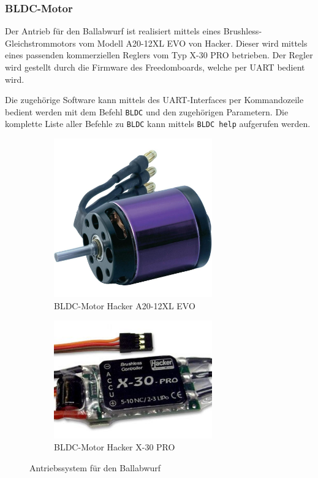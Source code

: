 \subsubsection{BLDC-Motor}
Der Antrieb für den Ballabwurf ist realisiert mittels eines
Brushless-Gleichstrommotors vom Modell A20-12XL EVO von Hacker.
Dieser wird mittels eines passenden kommerziellen Reglers vom
Typ X-30 PRO betrieben. Der Regler wird gestellt durch die Firmware
des Freedomboards, welche per UART bedient wird.

Die zugehörige Software kann mittels des UART-Interfaces per
Kommandozeile bedient werden mit dem Befehl \verb!BLDC! und den
zugehörigen Parametern. Die komplette Liste aller Befehle zu
\verb!BLDC! kann mittels \verb!BLDC help! aufgerufen werden.

\begin{figure}[h!]
	\centering
	\begin{subfigure}[b]{0.45\textwidth}
		\centering
		\includegraphics[width=0.75\textwidth]{../../fig/et/a20_12xl_evo.jpg}
		\caption{BLDC-Motor Hacker A20-12XL EVO}
	\end{subfigure}
	\begin{subfigure}[b]{0.45\textwidth}
		\centering
		\includegraphics[width=0.75\textwidth]{../../fig/et/x30_pro.jpg}
		\caption{BLDC-Motor Hacker X-30 PRO}
	\end{subfigure}
	\caption{Antriebssystem für den Ballabwurf}
\end{figure}

